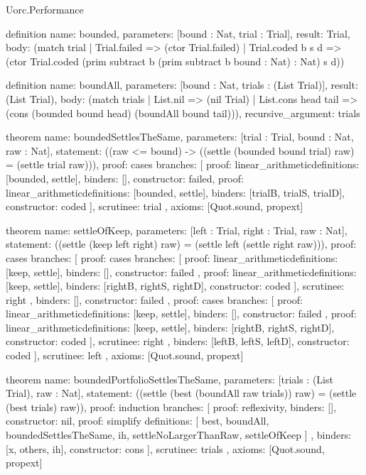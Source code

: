 \begin{lexlean}{Uorc.Performance}
\begin{semanticmodule}
definition{
  name: bounded,
  parameters: [bound : Nat, trial : Trial],
  result: Trial,
  body: (match trial
    | Trial.failed => (ctor Trial.failed)
    | Trial.coded b s d => (ctor Trial.coded (prim subtract b (prim subtract b bound : Nat) : Nat) s d))
}

definition{
  name: boundAll,
  parameters: [bound : Nat, trials : (List Trial)],
  result: (List Trial),
  body: (match trials
    | List.nil => (nil Trial)
    | List.cons head tail => (cons (bounded bound head) (boundAll bound tail))),
  recursive_argument: trials
}

theorem{
  name: boundedSettlesTheSame,
  parameters: [trial : Trial, bound : Nat, raw : Nat],
  statement: ((raw <= bound) -> ((settle (bounded bound trial) raw) = (settle trial raw))),
  proof: cases{
    branches: [
      {proof: linear_arithmetic{definitions: [bounded, settle]}, binders: [], constructor: failed},
      {
        proof: linear_arithmetic{definitions: [bounded, settle]},
        binders: [trialB, trialS, trialD],
        constructor: coded
      }
    ],
    scrutinee: trial
  },
  axioms: [Quot.sound, propext]
}

theorem{
  name: settleOfKeep,
  parameters: [left : Trial, right : Trial, raw : Nat],
  statement: ((settle (keep left right) raw) = (settle left (settle right raw))),
  proof: cases{
    branches: [
      {
        proof: cases{
          branches: [
            {
              proof: linear_arithmetic{definitions: [keep, settle]},
              binders: [],
              constructor: failed
            },
            {
              proof: linear_arithmetic{definitions: [keep, settle]},
              binders: [rightB, rightS, rightD],
              constructor: coded
            }
          ],
          scrutinee: right
        },
        binders: [],
        constructor: failed
      },
      {
        proof: cases{
          branches: [
            {
              proof: linear_arithmetic{definitions: [keep, settle]},
              binders: [],
              constructor: failed
            },
            {
              proof: linear_arithmetic{definitions: [keep, settle]},
              binders: [rightB, rightS, rightD],
              constructor: coded
            }
          ],
          scrutinee: right
        },
        binders: [leftB, leftS, leftD],
        constructor: coded
      }
    ],
    scrutinee: left
  },
  axioms: [Quot.sound, propext]
}

theorem{
  name: boundedPortfolioSettlesTheSame,
  parameters: [trials : (List Trial), raw : Nat],
  statement: ((settle (best (boundAll raw trials)) raw) = (settle (best trials) raw)),
  proof: induction{
    branches: [
      {proof: reflexivity{}, binders: [], constructor: nil},
      {
        proof: simplify{
          definitions: [
            best,
            boundAll,
            boundedSettlesTheSame,
            ih,
            settleNoLargerThanRaw,
            settleOfKeep
          ]
        },
        binders: [x, others, ih],
        constructor: cons
      }
    ],
    scrutinee: trials
  },
  axioms: [Quot.sound, propext]
}


\end{semanticmodule}
\end{lexlean}
